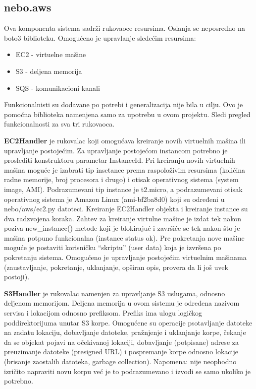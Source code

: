 \documentclass[a4paper]{article}
\begin{document}
\subsection{nebo.aws}

Ova komponenta sistema sadrži rukovaoce resursima. Oslanja se neposredno na
boto3 biblioteku. Omogućeno je upravlanje sledećim resursima:

\begin{itemize}
\item EC2 - virtuelne mašine
\item S3 - deljena memorija
\item SQS - komunikacioni kanali
\end{itemize}

Funkcionalnisti su dodavane po potrebi i generalizacija nije bila u cilju. Ovo
je pomoćna biblioteka namenjena samo za upotrebu u ovom projektu. Sledi pregled
funkcionalnosti za sva tri rukovaoca.

{\bf EC2Handler} je rukovalac koji omogućava kreiranje novih virtuelnih mašina
ili upravljanje postojećim. Za upravljanje postojećom instancom potrebno je
proslediti konstruktoru parametar InstanceId. Pri kreiranju novih virtuelnih
mašina moguće je izabrati tip insetance prema raspoloživim resursima (količina
radne memorije, broj procesora i drugo) i otisak operativnog sistema (system
image, AMI). Podrazumevani tip instance je t2.micro, a podrazumevani otisak
operativnog sistema je Amazon Linux (ami-bf2ba8d0) koji su određeni u
nebo/aws/ec2.py datoteci. Kreiranje EC2Handler objekta i kreiranje instance su
dva radzvojena koraka. Zahtev za kreiranje virtulne mašine je izdat tek nakon
poziva new\_instance() metode koji je blokirajuć i završiće se tek nakon što je
mašina potpuno funkcionalna (instance status ok). Pre pokretanja nove mašine
moguće je postaviti korisničku ``skriptu'' (user data) koja je izvršena po
pokretanju sistema. Omogućeno je upravljanje postojećim virtuelnim mašinama
(zaustavljanje, pokretanje, uklanjanje, opširan opis, provera da li još uvek
postoji).

{\bf S3Handler} je rukovalac namenjen za upravljanje S3 uslugama, odnosno
deljenom memorijom. Deljena memorija u ovom sistemu je određena nazivom servisa
i lokacijom odnosno prefiksom. Prefiks ima ulogu logičkog poddirektorijuma
unutar S3 korpe. Omogućene su operacije psotavljanje datoteke na zadatu
lokaciju, dobavljanje datoteke, pražnjenje i uklanjanje korpe, čekanje da se
objekat pojavi na očekivanoj lokaciji, dobavljanje (potpisane) adrese za
preuzimanje datoteke (presigned URL) i pospremanje korpe odnosno lokacije
(brisanje zaostalih datoteka, garbage collection). Napomena: nije neophodno
izričito napraviti novu korpu već je to podrazumevano i izvodi se samo ukoliko
je potrebno.
\end{document}
